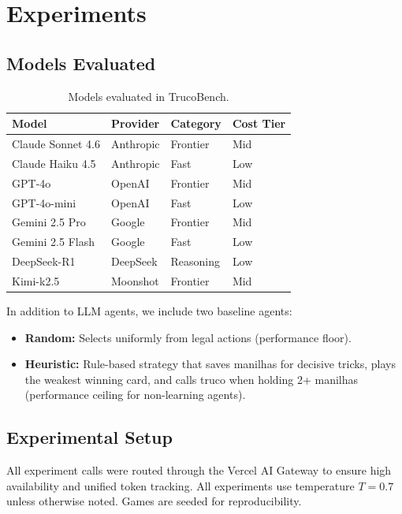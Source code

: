 \section{Experiments}

\subsection{Models Evaluated}

\begin{table}[h]
\centering
\caption{Models evaluated in TrucoBench.}
\label{tab:models}
\begin{tabular}{llll}
\toprule
\textbf{Model} & \textbf{Provider} & \textbf{Category} & \textbf{Cost Tier} \\
\midrule
Claude Sonnet 4.6 & Anthropic & Frontier & Mid \\
Claude Haiku 4.5 & Anthropic & Fast & Low \\
GPT-4o & OpenAI & Frontier & Mid \\
GPT-4o-mini & OpenAI & Fast & Low \\
Gemini 2.5 Pro & Google & Frontier & Mid \\
Gemini 2.5 Flash & Google & Fast & Low \\
DeepSeek-R1 & DeepSeek & Reasoning & Low \\
Kimi-k2.5 & Moonshot & Frontier & Mid \\
\bottomrule
\end{tabular}
\end{table}

In addition to LLM agents, we include two baseline agents:
\begin{itemize}
    \item \textbf{Random:} Selects uniformly from legal actions (performance floor).
    \item \textbf{Heuristic:} Rule-based strategy that saves manilhas for decisive tricks, plays the weakest winning card, and calls truco when holding 2+ manilhas (performance ceiling for non-learning agents).
\end{itemize}

\subsection{Experimental Setup}

All experiment calls were routed through the Vercel AI Gateway to ensure high availability and unified token tracking. All experiments use temperature $T = 0.7$ unless otherwise noted. Games are seeded for reproducibility.

